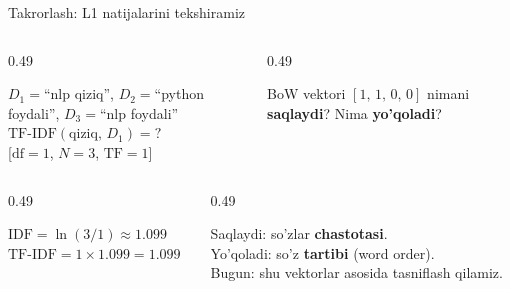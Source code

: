\documentclass[aspectratio=169,11pt]{beamer}
\begin{document}
\begin{frame}{Takrorlash: L1 natijalarini tekshiramiz}
  \begin{columns}[T]
    \begin{column}{0.49\textwidth}
      \begin{tcolorbox}[warnbox,title=Savol 1]
        \small
        $D_1{=}$``nlp qiziq'',\; $D_2{=}$``python foydali'',\;
        $D_3{=}$``nlp foydali''\\[3pt]
        $\mathrm{TF\text{-}IDF}(\text{qiziq},\,D_1) = ?$\\
        \footnotesize [$\mathrm{df}=1$,\; $N=3$,\; $\mathrm{TF}=1$]
      \end{tcolorbox}
    \end{column}
    \begin{column}{0.49\textwidth}
      \begin{tcolorbox}[warnbox,title=Savol 2]
        \small
       BoW vektori $[1,\,1,\,0,\,0]$ nimani \textbf{saqlaydi}?\; Nima \textbf{yo'qoladi}?
      \end{tcolorbox}
    \end{column}
  \end{columns}
  \pause
  \vspace{4pt}
  \begin{columns}[T]
    \begin{column}{0.49\textwidth}
      \begin{tcolorbox}[okbox,title=Javob 1]
        \small
        $\mathrm{IDF}=\ln(3/1)\approx 1.099$\\
        $\mathrm{TF\text{-}IDF}=1\times 1.099=\mathbf{1.099}$
      \end{tcolorbox}
    \end{column}
    \begin{column}{0.49\textwidth}
      \begin{tcolorbox}[okbox,title=Javob 2]
        \small
        Saqlaydi: so'zlar \textbf{chastotasi}.\\
        Yo'qoladi: so'z \textbf{tartibi} (word order).\\
        \footnotesize\textcolor{halfgray}{Bugun: shu vektorlar asosida tasniflash qilamiz.}
      \end{tcolorbox}
    \end{column}
  \end{columns}
\end{frame}
\end{document}
